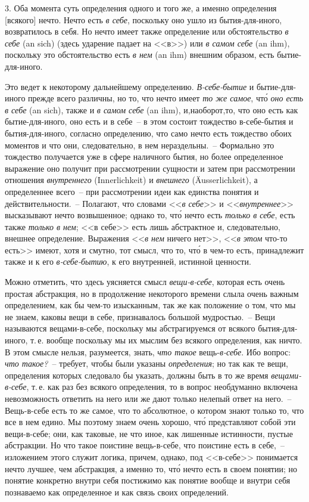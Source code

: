 3. Оба момента суть определения одного и того же, а
именно определения [всякого] нечто. Нечто есть \emph{в себе},
поскольку оно ушло из бытия-для-иного, возвратилось
в себя. Но нечто имеет также определение или обстоятельство
\emph{в себе} (an sich) (здесь ударение падает на <<в>>)
или \emph{в самом себе} (an ihm), поскольку это обстоятельство
есть \emph{в нем} (an ihm) внешним образом, есть бытие-для-иного.

Это ведет к некоторому дальнейшему определению.
\emph{В-себе-бытие} и бытие-для-иного прежде всего различны,
но то, что нечто имеет \emph{то же самое}, чт\'о \emph{оно есть в себе}
(an sich), также и \emph{в самом себе} (an ihm), и,наоборот,то,
что оно есть как бытие-для-иного, оно есть и в себе~--
в этом состоит тождество в-себе-бытия и бытия-для-иного,
согласно определению, что само нечто есть тождество
обоих моментов и что они, следовательно, в нем нераздельны.~--
Формально это тождество получается уже в
сфере наличного бытия, но более определенное выражение
оно получит при рассмотрении сущности и затем
при рассмотрении отношения \emph{внутреннего} (Innerlichkeit)
и \emph{внешнего} (Äusserlichkeit), а определеннее всего~-- при
рассмотрении идеи как единства понятия и действительности.~--
Полагают, что словами <<\emph{в себе}>> и <<\emph{внутреннее}>>
высказывают нечто возвышенное; однако то, чт\'о нечто
есть \emph{только в себе}, есть также \emph{только в нем}; <<в себе>>
есть лишь абстрактное и, следовательно, внешнее определение.
Выражения <<\emph{в нем} ничего нет>>, <<\emph{в этом} что-то
есть>> имеют, хотя и смутно, тот смысл, что то, чт\'о в чем-то
есть, принадлежит также и к его \emph{в-себе-бытию}, к его
внутренней, истинной ценности.

Можно отметить, что здесь уясняется смысл \emph{вещи-в-себе},
которая есть очень простая абстракция, но в продолжение
некоторого времени слыла очень важным определением,
как бы чем-то изысканным, так же как положение
о том, что мы не знаем, каковы вещи в себе,
признавалось большой мудростью.~-- Вещи называются
вещами-в-себе, поскольку мы абстрагируемся от всякого
бытия-для-иного, т.\,е. вообще поскольку мы их мыслим
без всякого определения, как ничто. В этом смысле нельзя,
разумеется, знать, \emph{что такое} вещь-\emph{в-себе}. Ибо вопрос:
\emph{что такое?}~-- требует, чтобы были указаны \emph{определения};
но так как те вещи, определения которых следовало бы
указать, должны быть в то же время \emph{вещами-в-себе}, т.\,е.
как раз без всякого определения, то в вопрос необдуманно
включена невозможность ответить на него или же
дают только нелепый ответ на него.~-- Вещь-в-себе есть
то же самое, что то абсолютное, о котором знают только
то, что все в нем едино. Мы поэтому знаем очень хорошо,
чт\'о представляют собой эти вещи-в-себе; они, как
таковые, не что иное, как лишенные истинности, пустые
абстракции. Но что такое поистине вещь-в-себе, что поистине
есть в себе,~-- изложением этого служит логика,
причем, однако, под <<в-себе>> понимается нечто лучшее,
чем абстракция, а именно то, чт\'о нечто есть в своем
понятии; но понятие конкретно внутри себя постижимо
как понятие вообще и внутри себя познаваемо как определенное
и как связь своих определений.

